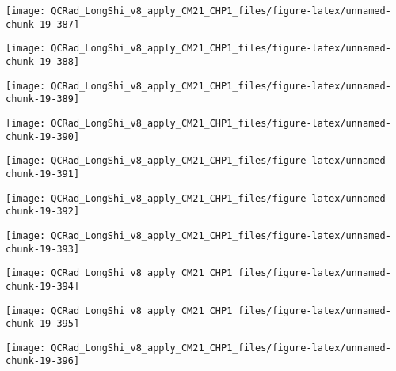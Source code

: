 \documentclass[
  10pt,
  a4paper,oneside]{article}
\begin{document}
\begin{center}\texttt{[image: QCRad\_LongShi\_v8\_apply\_CM21\_CHP1\_files/figure-latex/unnamed-chunk-19-387]} \end{center}

\begin{center}\texttt{[image: QCRad\_LongShi\_v8\_apply\_CM21\_CHP1\_files/figure-latex/unnamed-chunk-19-388]} \end{center}

\begin{center}\texttt{[image: QCRad\_LongShi\_v8\_apply\_CM21\_CHP1\_files/figure-latex/unnamed-chunk-19-389]} \end{center}

\begin{center}\texttt{[image: QCRad\_LongShi\_v8\_apply\_CM21\_CHP1\_files/figure-latex/unnamed-chunk-19-390]} \end{center}

\begin{center}\texttt{[image: QCRad\_LongShi\_v8\_apply\_CM21\_CHP1\_files/figure-latex/unnamed-chunk-19-391]} \end{center}

\begin{center}\texttt{[image: QCRad\_LongShi\_v8\_apply\_CM21\_CHP1\_files/figure-latex/unnamed-chunk-19-392]} \end{center}

\begin{center}\texttt{[image: QCRad\_LongShi\_v8\_apply\_CM21\_CHP1\_files/figure-latex/unnamed-chunk-19-393]} \end{center}

\begin{center}\texttt{[image: QCRad\_LongShi\_v8\_apply\_CM21\_CHP1\_files/figure-latex/unnamed-chunk-19-394]} \end{center}

\begin{center}\texttt{[image: QCRad\_LongShi\_v8\_apply\_CM21\_CHP1\_files/figure-latex/unnamed-chunk-19-395]} \end{center}

\begin{center}\texttt{[image: QCRad\_LongShi\_v8\_apply\_CM21\_CHP1\_files/figure-latex/unnamed-chunk-19-396]} \end{center}
\end{document}
